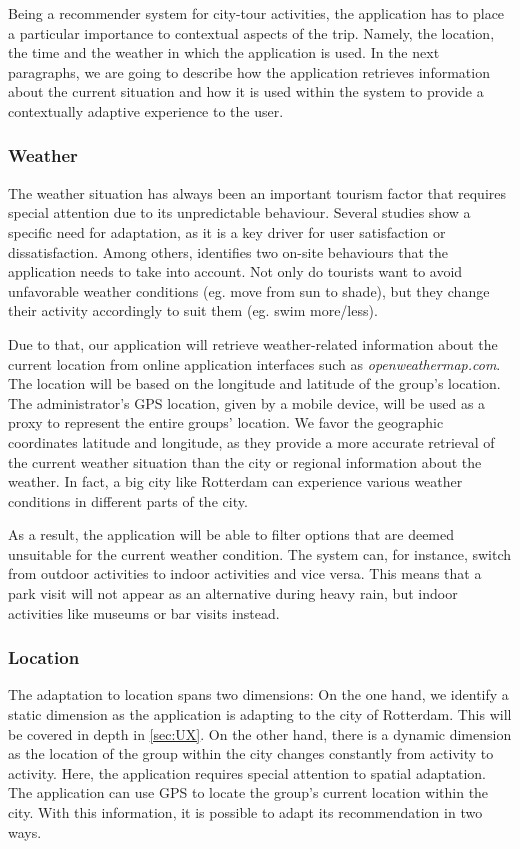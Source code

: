 \documentclass[11pt,a4paper,oneside]{article}
\begin{document}
Being a recommender system for city-tour activities, the application has to place a particular importance to contextual aspects of the trip. Namely, the location, the time and the weather in which the application is used. In the next paragraphs, we are going to describe how the application retrieves information about the current situation and how it is used within the system to provide a contextually adaptive experience to the user.

\subsubsection{Weather}
The weather situation has always been an important tourism factor that requires special attention due to its unpredictable behaviour. Several studies show a specific need for adaptation, as it is a key driver for user satisfaction or dissatisfaction.\cite{becken_ImportanceClimateWeather_2010} Among others, \citeauthor{defreitas_TourismClimatologyEvaluating_2003} identifies two on-site behaviours that the application needs to take into account. Not only do tourists want to avoid unfavorable weather conditions (eg. move from sun to shade), but they change their activity accordingly to suit them (eg. swim more/less). 

Due to that, our application will retrieve weather-related information about the current location from online application interfaces such as \emph{openweathermap.com}. The location will be based on the longitude and latitude of the group's location. The administrator's GPS location, given by a mobile device, will be used as a proxy to represent the entire groups' location. We favor the geographic coordinates latitude and longitude, as they provide a more accurate retrieval of the current weather situation than the city or regional information about the weather. In fact, a big city like Rotterdam can experience various weather conditions in different parts of the city. 

As a result, the application will be able to filter options that are deemed unsuitable for the current weather condition. The system can, for instance, switch from outdoor activities to indoor activities and vice versa.\cite{creemers2015meteorological} This means that a park visit will not appear as an alternative during heavy rain, but indoor activities like museums or bar visits instead.

\subsubsection{Location}
The adaptation to location spans two dimensions: On the one hand, we identify a static dimension as the application is adapting to the city of Rotterdam. This will be covered in depth in \autoref{sec:UX}. On the other hand, there is a dynamic dimension as the location of the group within the city changes constantly from activity to activity. Here, the application requires special attention to spatial adaptation. The application can use GPS to locate the group's current location within the city. With this information, it is possible to adapt its recommendation in two ways. 
\end{document}
